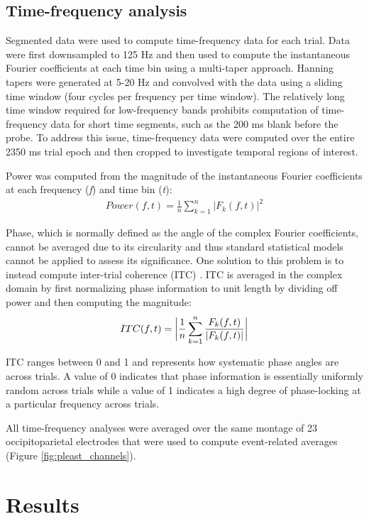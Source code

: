 \documentclass[dwyatte_dissertation.tex]{subfiles}
\begin{document}
\subsection{Time-frequency analysis}
Segmented data were used to compute time-frequency data for each trial. Data were first downsampled to 125 Hz and then used to compute the instantaneous Fourier coefficients at each time bin using a multi-taper approach. Hanning tapers were generated at 5-20 Hz and convolved with the data using a sliding time window (four cycles per frequency per time window). The relatively long time window required for low-frequency bands prohibits computation of time-frequency data for short time segments, such as the 200 ms blank before the probe. To address this issue, time-frequency data were computed over the entire 2350 ms trial epoch and then cropped to investigate temporal regions of interest.

Power was computed from the magnitude of the instantaneous Fourier coefficients at each frequency (\textit{f}) and time bin (\textit{t}):
\begin{align*}
Power(f,t) = \frac{1}{n} \sum_{k=1}^{n}{|F_k(f,t)|}^2
\end{align*}

Phase, which is normally defined as the angle of the complex Fourier coefficients, cannot be averaged due to its circularity and thus standard statistical models cannot be applied to assess its significance. One solution to this problem is to instead compute inter-trial coherence (ITC) \cite{LachauxRodriguezMartinerieEtAl99}. ITC is averaged in the complex domain by first normalizing phase information to unit length by dividing off power and then computing the magnitude:
\begin{align*}
ITC(f,t) = \bigg{|}\frac{1}{n} \sum_{k=1}^{n}{\frac{F_k(f,t)}{|F_k(f,t)|}}\bigg{|}
\end{align*}

ITC ranges between 0 and 1 and represents how systematic phase angles are across trials. A value of 0 indicates that phase information is essentially uniformly random across trials while a value of 1 indicates a high degree of phase-locking at a particular frequency across trials.

All time-frequency analyses were averaged over the same montage of 23 occipitoparietal electrodes that were used to compute event-related averages (Figure \ref{fig:pleast_channels}). 

\section{Results}
\end{document}
